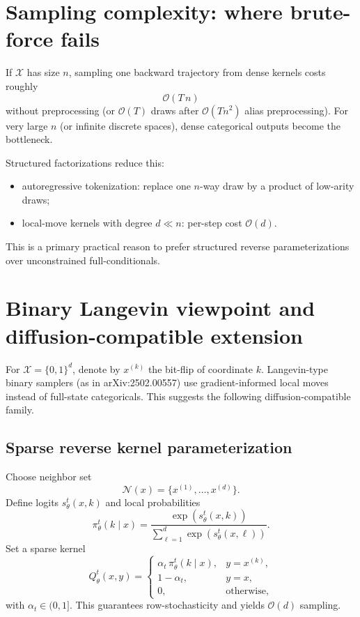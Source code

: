 \documentclass[11pt]{article}
\begin{document}
\section{Sampling complexity: where brute-force fails}

If $\mathcal X$ has size $n$, sampling one backward trajectory from dense kernels costs roughly
\[
\mathcal O(T\,n)
\]
without preprocessing (or $\mathcal O(T)$ draws after $\mathcal O(Tn^2)$ alias preprocessing).
For very large $n$ (or infinite discrete spaces), dense categorical outputs become the bottleneck.

Structured factorizations reduce this:
\begin{itemize}
\item autoregressive tokenization: replace one $n$-way draw by a product of low-arity draws;
\item local-move kernels with degree $d\ll n$: per-step cost $\mathcal O(d)$.
\end{itemize}
This is a primary practical reason to prefer structured reverse parameterizations over unconstrained full-conditionals.

\section{Binary Langevin viewpoint and diffusion-compatible extension}

For $\mathcal X=\{0,1\}^d$, denote by $x^{(k)}$ the bit-flip of coordinate $k$.
Langevin-type binary samplers (as in arXiv:2502.00557) use gradient-informed local moves instead of full-state categoricals.
This suggests the following diffusion-compatible family.

\subsection*{Sparse reverse kernel parameterization}
Choose neighbor set
\[
\mathcal N(x)=\{x^{(1)},\dots,x^{(d)}\}.
\]
Define logits $s_\theta^t(x,k)$ and local probabilities
\[
\pi_\theta^t(k\mid x)
=\frac{\exp(s_\theta^t(x,k))}{\sum_{\ell=1}^d \exp(s_\theta^t(x,\ell))}.
\]
Set a sparse kernel
\[
Q_\theta^t(x,y)=
\begin{cases}
\alpha_t\,\pi_\theta^t(k\mid x), & y=x^{(k)},\\
1-\alpha_t, & y=x,\\
0, & \text{otherwise},
\end{cases}
\]
with $\alpha_t\in(0,1]$.
This guarantees row-stochasticity and yields $\mathcal O(d)$ sampling.
\end{document}
